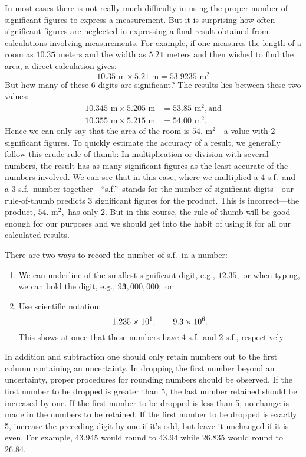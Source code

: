 \documentclass[main.tex]{subfiles}
\begin{document}
In most cases there is not really much difficulty in using the proper number of significant figures to express a measurement. But it is surprising how often significant figures are neglected in expressing a final result obtained from calculations involving measurements.  For example, if one measures the length of a room as $10.3\mathbf{5}$ meters and the width as $5.2\mathbf{1}$ meters and then wished to find the area, a direct calculation gives:
\[
10.35 \text{ m} \times 5.21 \text{ m} = 53.9235 \text{ m}^2
\]
But how many of these 6 digits are significant? The results lies between  these two values:
\begin{align*}
10.345 \text{ m} \times 5.205 \text{ m} &= 53.85 \text{ m}^2, \text{and}\\
10.355 \text{ m} \times 5.215 \text{ m} &= 54.00 \text{ m}^2.
\end{align*}
Hence we can only say that the area of the room is $54. \text{ m}^2$---a value with 2 significant figures. To quickly estimate the accuracy of a result, we generally follow this crude rule-of-thumb: In multiplication or division with several numbers, the result has as many significant figures as the least accurate of the numbers involved. We can see that in this case, where we multiplied a 4 s.f.\ and a 3 s.f.\ number together---``s.f.''\ stands for the number of significant digits---our rule-of-thumb predicts 3 significant figures for the product. This is incorrect---the product, $54. \text{ m}^2,$ has only 2. But in this course, the rule-of-thumb will be good enough for our purposes and we should get into the habit of using it for all our calculated results.

There are two ways to record the number of s.f.\ in a number: 
\begin{enumerate}
\item
We can underline of the smallest significant digit, e.g., $12.3\underline{5},$ or when typing, we can bold the digit, e.g., $9\mathbf{3},000,000;$ or
\item
Use scientific notation:
\[
1.235\times 10^{1}, \qquad 9.3\times 10^{6}.
\]
This shows at once that these numbers have 4 s.f.\ and 2 s.f., respectively.
\end{enumerate}

In addition and subtraction one should only retain numbers out to the first column containing an uncertainty.  In dropping the first number beyond an uncertainty, proper procedures for rounding numbers should be observed.  If the first number to be dropped is greater than 5, the last number retained should be increased by one. If the first number to be dropped is less than 5, no change is made in the numbers to be retained.  If the first number to be dropped is exactly 5, increase the preceding digit by one if it's odd, but leave it unchanged if it is even.    For example, 43.945 would round to 43.94 while 26.835 would round to 26.84.
\end{document}
